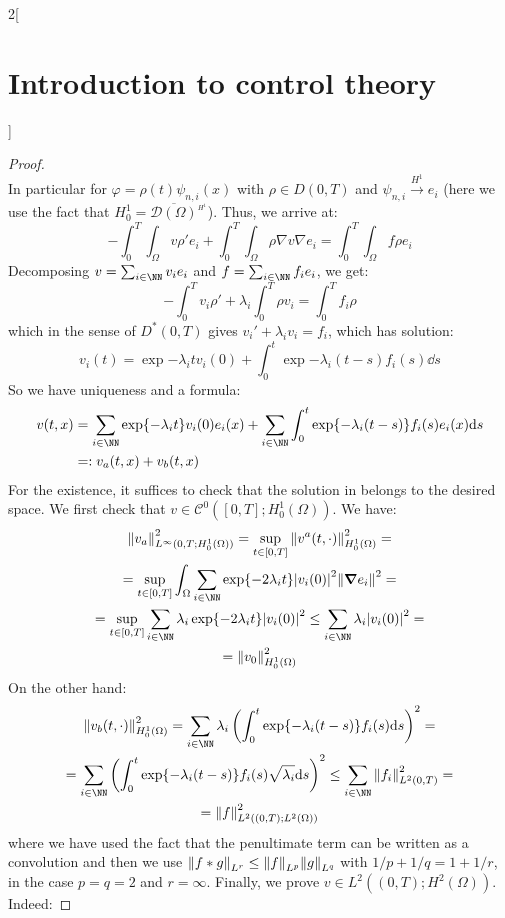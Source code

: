 \documentclass[../../../main_math.tex]{subfiles}
\begin{document}
\begin{multicols}{2}[\section{Introduction to control theory}]
\begin{proof}
$$    $$
    In particular for $\varphi = \rho(t)\psi_{n,i}(x)$ with $\rho\in D(0,T)$ and $\psi_{n,i}\overset{H^1}{\to} e_i$ (here we use the fact that $H_0^1=\overline{\mathcal{D}(\Omega)}^{{}_{H^1}}$). Thus, we arrive at:
    $$
      -\int_0^T\int_\Omega v \rho' e_i + \int_0^T\int_\Omega \rho\nabla v \nabla e_i = \int_0^T\int_\Omega f \rho e_i
    $$
    Decomposing $v=\sum_{i\in\NN} v_i e_i$ and $f=\sum_{i\in\NN} f_i e_i$, we get:
    $$
      -\int_0^T v_i \rho' + \lambda_i\int_0^T \rho v_i = \int_0^T f_i \rho
    $$
    which in the sense of $D^*(0,T)$ gives $v_i'+\lambda_i v_i = f_i$, which has solution:
    $$
      v_i(t)=\exp{-\lambda_i t}v_i(0)+\int_0^t\exp{-\lambda_i(t-s)}f_i(s)\dd s
    $$
    So we have uniqueness and a formula:
    \begin{align}\label{ICT:heat_equation_solution}
      v(t,x) & =\sum_{i\in\NN}\exp{-\lambda_i t}v_i(0)e_i(x)+\sum_{i\in\NN}\int_0^t\exp{-\lambda_i(t-s)} f_i(s)e_i(x)\dd s \\
             & =:v_a(t,x)+v_b(t,x)\nonumber
    \end{align}
    For the existence, it suffices to check that the solution in  belongs to the desired space. We first check that $v\in \mathcal{C}^0([0,T]; H_0^1(\Omega))$. We have:
    \begin{multline*}
      \norm{v_a}^2_{L^\infty(0,T; H_0^1(\Omega))} = \sup_{t\in[0,T]}\norm{v^a(t,\cdot)}_{H_0^1(\Omega)}^2 =\\=\sup_{t\in[0,T]}\int_\Omega\sum_{i\in\NN}\exp{-2\lambda_i t}\abs{v_i(0)}^2\norm{\grad e_i}^2=\\= \sup_{t\in[0,T]}\sum_{i\in\NN}\lambda_i\exp{-2\lambda_i t}\abs{v_i(0)}^2 \leq \sum_{i\in\NN}\lambda_i\abs{v_i(0)}^2 =\\= \norm{v_0}^2_{H_0^1(\Omega)}
    \end{multline*}
    On the other hand:
    \begin{multline*}
      \norm{v_b(t,\cdot)}^2_{H_0^1(\Omega)} = \sum_{i\in\NN}\lambda_i\left(\int_0^t\exp{-\lambda_i(t-s)}f_i(s)\dd s\right)^2=\\= \sum_{i\in\NN}\left( \int_0^t\exp{-\lambda_i(t-s)}f_i(s)\sqrt{\lambda_i}\dd s\right)^2 \leq \sum_{i\in\NN}\norm{f_i}_{L^2(0,T)}^2 = \\=\norm{f}^2_{L^2((0,T);L^2(\Omega))}
    \end{multline*}
    where we have used the fact that the penultimate term can be written as a convolution and then we use  $\norm{f*g}_{L^r} \leq \norm{f}_{L^p}\norm{g}_{L^q}$ with $1/p+1/q=1+1/r$, in the case $p=q=2$ and $r=\infty$. Finally, we prove $v\in L^2((0,T); H^2(\Omega))$. Indeed:

\end{proof}
\end{multicols}
\end{document}
